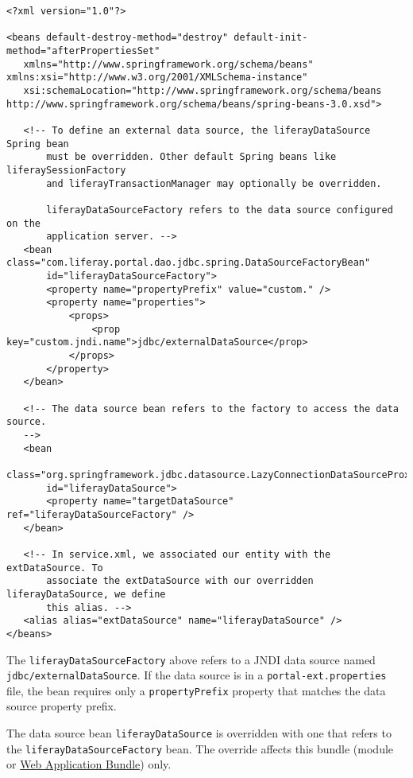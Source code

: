 \begin{enumerate}
\begin{verbatim}
<?xml version="1.0"?>

<beans default-destroy-method="destroy" default-init-method="afterPropertiesSet"
   xmlns="http://www.springframework.org/schema/beans" xmlns:xsi="http://www.w3.org/2001/XMLSchema-instance"
   xsi:schemaLocation="http://www.springframework.org/schema/beans http://www.springframework.org/schema/beans/spring-beans-3.0.xsd">

   <!-- To define an external data source, the liferayDataSource Spring bean
       must be overridden. Other default Spring beans like liferaySessionFactory
       and liferayTransactionManager may optionally be overridden.

       liferayDataSourceFactory refers to the data source configured on the
       application server. -->
   <bean class="com.liferay.portal.dao.jdbc.spring.DataSourceFactoryBean"
       id="liferayDataSourceFactory">
       <property name="propertyPrefix" value="custom." />
       <property name="properties">
           <props>
               <prop key="custom.jndi.name">jdbc/externalDataSource</prop>
           </props>
       </property>
   </bean>

   <!-- The data source bean refers to the factory to access the data source.
   -->
   <bean
       class="org.springframework.jdbc.datasource.LazyConnectionDataSourceProxy"
       id="liferayDataSource">
       <property name="targetDataSource" ref="liferayDataSourceFactory" />
   </bean>

   <!-- In service.xml, we associated our entity with the extDataSource. To
       associate the extDataSource with our overridden liferayDataSource, we define
       this alias. -->
   <alias alias="extDataSource" name="liferayDataSource" />
</beans>
\end{verbatim}
\end{enumerate}

The \texttt{liferayDataSourceFactory} above refers to a JNDI data source
named \texttt{jdbc/externalDataSource}. If the data source is in a
\texttt{portal-ext.properties} file, the bean requires only a
\texttt{propertyPrefix} property that matches the data source property
prefix.

The data source bean \texttt{liferayDataSource} is overridden with one
that refers to the \texttt{liferayDataSourceFactory} bean. The override
affects this bundle (module or
\href{/docs/7-2/customization/-/knowledge_base/c/deploying-wars-wab-generator}{Web
Application Bundle}) only.

